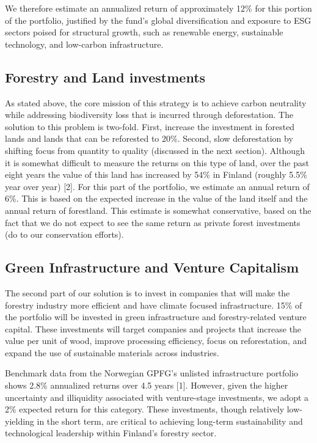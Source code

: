 \par We therefore estimate an annualized return of approximately 12\% for this portion of the portfolio, justified by the fund’s global diversification and exposure to ESG sectors poised for structural growth, such as renewable energy, sustainable technology, and low-carbon infrastructure.


\subsection*{Forestry and Land investments}
As stated above, the core mission of this strategy is to achieve carbon neutrality while addressing biodiversity loss that is incurred through deforestation. The solution to this problem is two-fold. First, increase the investment in forested lands and lands that can be reforested to 20\%. Second, slow deforestation by shifting focus from quantity to quality (discussed in the next section). Although it is somewhat difficult to measure the returns on this type of land, over the past eight years the value of this land has increased by 54\% in Finland (roughly 5.5\% year over year) [2]. For this part of the portfolio, we estimate an annual return of 6\%. This is based on the expected increase in the value of the land itself and the annual return of forestland. This estimate is somewhat conservative, based on the fact that we do not expect to see the same return as private forest investments (do to our conservation efforts).

\subsection*{Green Infrastructure and Venture Capitalism}
The second part of our solution is to invest in companies that will make the forestry industry more efficient and have climate focused infrastructure. 15\% of the portfolio will be invested in green infrastructure and forestry-related venture capital. These investments will target companies and projects that increase the value per unit of wood, improve processing efficiency, focus on reforestation, and expand the use of sustainable materials across industries.
\par Benchmark data from the Norwegian GPFG’s unlisted infrastructure portfolio shows 2.8\% annualized returns over 4.5 years [1]. However, given the higher uncertainty and illiquidity associated with venture-stage investments, we adopt a 2\% expected return for this category. These investments, though relatively low-yielding in the short term, are critical to achieving long-term sustainability and technological leadership within Finland’s forestry sector.


